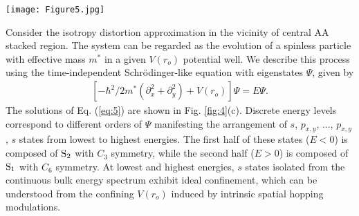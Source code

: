 \documentclass[%
reprint,
amsmath,amssymb,amsfonts
aps,
superscriptaddress,
prx
]{revtex4-1}
\begin{document}
\begin{figure*}
\texttt{[image: Figure5.jpg]}%
\caption{(a) Band structures and related DOS obtained by the TBM with $\theta=6.01^{\circ}$ and $h=a/\sqrt{3}$. Two superflat bands ($\Xi_{-}$ and $\Xi_{+}$) are labeled in blue located at highest and lowest energies with extremely sharp DOS. Besides, typical moir\'e bands labeled in red appear around the zero energy with divergent DOS. 
(b) Various eigenstates for $\Xi_{-}$ and $\Xi_{+}$ bands and adjacent bands, which are arranged from the lowest to highest energy, i.e., A-F, corresponding to $s$, $p_{x,y}$, ..., $p_{x,y}$ and $s$ states. 
(c) The energies of superflat bands varied with $h$ around $a/\sqrt{3}$. Different $\theta$ (i.e., $3.48^{\circ}$, $3.89^{\circ}$, $4.41^{\circ}$, $5.09^{\circ}$ and $6.01^{\circ}$) have also been represented in different colors. Faint circles and dark dotted lines correspond to the results in TBM and PWM, respectively, while faint gray dotted lines indicate the bulk energies of AA stacked lattices for infinite $h$.}
\label{fig:5}
\end{figure*}%
Consider the isotropy distortion approximation in the vicinity of central AA stacked region. The system can be regarded as the evolution of a spinless particle with effective mass $m^{*}$ in a given $V(r_o)$ potential well. We describe this process using the time-independent Schr\"odinger-like equation with eigenstates $\Psi$, given by 
\begin{equation}
\begin{split}
[-\hbar^2/2m^{*}(\partial^2_x+\partial^2_y)+V(r_o)]\Psi =E\Psi. 
\label{eq:5}
\end{split}
\end{equation}
The solutions of Eq. (\ref{eq:5}) are shown in Fig. \ref{fig:4}(c). Discrete energy levels correspond to different orders of $\Psi$ manifesting the arrangement of $s$, $p_{x,y}$, ..., $p_{x,y}$, $s$ states from lowest to highest energies. The first half of these states ($E<0$) is composed of ${\rm S}_2$ with $C_3$ symmetry, while the second half ($E>0$) is composed of ${\rm S}_1$ with $C_6$ symmetry. At lowest and highest energies, $s$ states isolated from the continuous bulk energy spectrum exhibit ideal confinement, which can be understood from the confining $V(r_o)$ induced by intrinsic spatial hopping modulations. 
\end{document}
